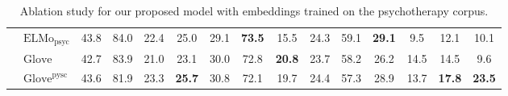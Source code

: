 \begin{table*}[!h]
\begin{center}
{\begin{tabular}{c|l|cccc|ccccccccc}
                               & $\text{ELMo}_{\text{psyc}}$  & 43.8       & 84.0       & 22.4       & 25.0       & 29.1       & {\bf 73.5} & 15.5       & 24.3       & 59.1       & {\bf 29.1} & 9.5        & 12.1       & 10.1       \\
                               & $\text{Glove}$               & 42.7       & 83.9       & 21.0       & 23.1       & 30.0       & 72.8       & {\bf 20.8} & 23.7       & 58.2       & 26.2       & 14.5       & 14.5       & 9.6        \\
                               & $\text{Glove}^{\text{pysc}}$ & 43.6       & 81.9       & 23.3       & {\bf 25.7} & 30.8       & 72.1       & 19.7       & 24.4       & 57.3       & 28.9       & 13.7       & {\bf 17.8} & {\bf 23.5} \\
\hline \bottomrule
\end{tabular}}
\end{center}
\caption{\label{tbl:rst_elmo} Ablation study for our proposed model
  with embeddings trained on the psychotherapy corpus.}
\end{table*}

